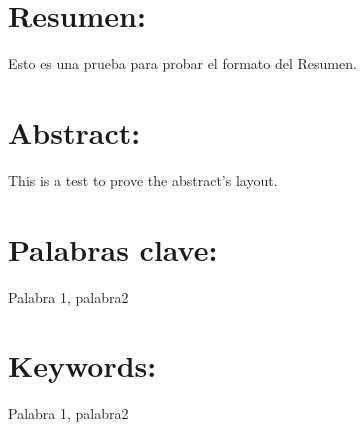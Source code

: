 \documentclass[12pt, american, spanish]{../packages/masterfotonicaucm}
\begin{document}
\pagestyle{plain}



\section*{{\large{}Resumen: }}

Esto es una prueba para probar el formato del Resumen.

\section*{{\large{}Abstract: }}

This is a test to prove the abstract's layout.

\vfill

\section*{{\large{}Palabras clave: }}

Palabra 1, palabra2

\section*{{\large{}Keywords:}}

Palabra 1, palabra2

\cleardoublepage%



\cleardoublepage%

\tableofcontents%
\cleardoublepage%


\pagestyle{plain}





% 
% 
% 



\cleardoublepage%
% 
\printbibliography[]

\clearpage



\end{document}

